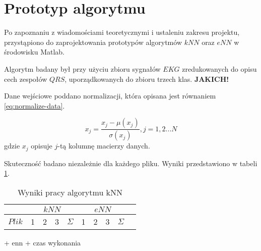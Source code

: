 \section{Prototyp algorytmu}
Po zapoznaniu z wiadomościami teoretycznymi i ustaleniu zakresu projektu, przystąpiono do zaprojektowania prototypów algorytmów $kNN$ oraz $eNN$ w środowisku Matlab.

Algorytm badany był przy użyciu zbioru sygnałów $EKG$ zredukowanych do opisu cech zespołów $QRS$, uporządkowanych do zbioru trzech klas. \textbf{JAKICH!}

Dane wejściowe poddano normalizacji, która opisana jest równaniem \ref{eq:normalize-data}.

\begin{equation}
\label{eq:normalize-data}
x_j = \frac{x_j - \mu(x_j)}{\sigma(x_j)}, j=1,2...N
\end{equation}
gdzie $x_j$ opisuje $j$-tą kolumnę macierzy danych.

Skuteczność badano niezależnie dla każdego pliku. Wyniki przedstawiono w tabeli \ref{tab:matlab-skutecznosc}.

\begin{table}[!htb]
	\centering
	\begin{tabular}{|c|r|r|r|r|r|r|r|r|r|}
		\hline
		& \multicolumn{4}{c|}{$kNN$} & \multicolumn{4}{|c|}{$eNN$} \\
		\hline
		$Plik$ & 1 & 2 & 3 & $\Sigma$ & 1 & 2 & 3 & $\Sigma$ \\
		\hline
	\end{tabular}
	\caption{Wyniki pracy algorytmu kNN}
	\label{tab:matlab-skutecznosc}
	

\end{table}
+ enn + czas wykonania